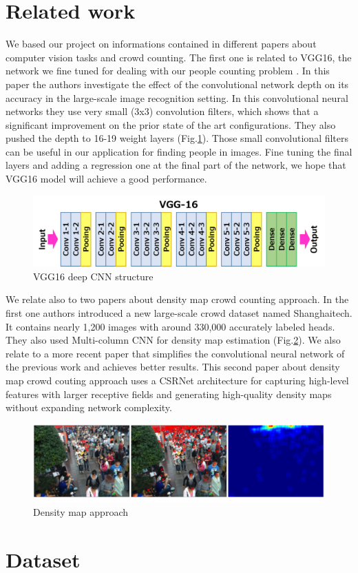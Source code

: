 \documentclass[10pt,twocolumn,letterpaper]{article}
\begin{document}
\section{Related work}

We based our project on informations contained in different papers about computer vision tasks and crowd counting. The first one is related to VGG16, the network we fine tuned for dealing with our people counting problem \cite{simonyan2014very}. In this paper the authors investigate the effect of the convolutional network depth on its accuracy in the
large-scale image recognition setting. In this convolutional neural networks they use very small (3x3) convolution filters, which shows that a significant improvement on the prior state of the art configurations. They also pushed the depth to 16-19 weight layers (Fig.\ref{fig:vgg16}). Those small convolutional filters can be useful in our application for finding people in images. Fine tuning the final layers and adding a regression one at the final part of the network, we hope that VGG16 model will achieve a good performance. 

\begin{figure}[h!]
  \includegraphics[width=\linewidth]{pics/vgg16.png}
  \caption{VGG16 deep CNN structure}
  \label{fig:vgg16}
\end{figure}

We relate also to two papers about density map crowd counting approach. In the first one \cite{zhang2016single} authors introduced a new large-scale crowd dataset named Shanghaitech. It contains nearly 1,200 images with around 330,000 accurately labeled heads. They also used Multi-column CNN for density map estimation (Fig.\ref{fig:densitymap}). We also relate to a more recent paper that simplifies the convolutional neural network of the previous work and achieves better results. This second paper about density map crowd couting approach \cite{li2018csrnet} uses a CSRNet architecture for capturing high-level features with
larger receptive fields and generating high-quality density maps without expanding network complexity. 

\begin{figure}[h!]
  \includegraphics[width=\linewidth]{pics/densitymapapproach.png}
  \caption{Density map approach}
  \label{fig:densitymap}
\end{figure}



\section{Dataset}






%
%
\end{document}
